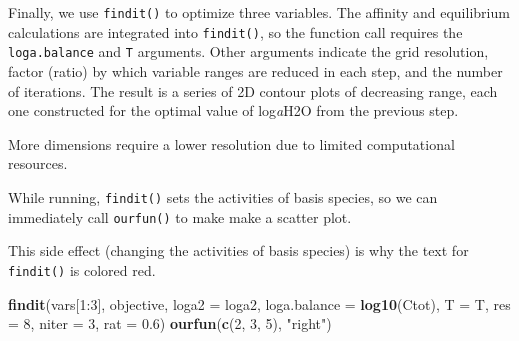 \documentclass[]{tufte-book}
\newenvironment{Shaded}{}{}
\newcommand{\KeywordTok}[1]{\textcolor[rgb]{0.00,0.44,0.13}{\textbf{#1}}}
\newcommand{\DataTypeTok}[1]{\textcolor[rgb]{0.56,0.13,0.00}{#1}}
\newcommand{\DecValTok}[1]{\textcolor[rgb]{0.25,0.63,0.44}{#1}}
\newcommand{\FloatTok}[1]{\textcolor[rgb]{0.25,0.63,0.44}{#1}}
\newcommand{\StringTok}[1]{\textcolor[rgb]{0.25,0.44,0.63}{#1}}
\newcommand{\OperatorTok}[1]{\textcolor[rgb]{0.40,0.40,0.40}{#1}}
\newcommand{\NormalTok}[1]{#1}
\begin{document}
\begin{Shaded}
\end{Shaded}

Finally, we use {\texttt{findit()}} to optimize three variables. The
affinity and equilibrium calculations are integrated into
{\texttt{findit()}}, so the function call requires the
\texttt{loga.balance} and \texttt{T} arguments. Other arguments indicate
the grid resolution, factor (ratio) by which variable ranges are reduced
in each step, and the number of iterations. The result is a series of 2D
contour plots of decreasing range, each one constructed for the optimal
value of log\emph{a}H2O from the previous step.

\begin{marginfigure}
More dimensions require a lower resolution due to limited computational
resources.
\end{marginfigure}

While running, {\texttt{findit()}} sets the activities of basis species,
so we can immediately call \texttt{ourfun()} to make make a scatter
plot.

\begin{marginfigure}
This side effect (changing the activities of basis species) is why the
text for {\texttt{findit()}} is colored red.
\end{marginfigure}

\begin{Shaded}
\begin{Highlighting}[]
\KeywordTok{findit}\NormalTok{(vars[}\DecValTok{1}\OperatorTok{:}\DecValTok{3}\NormalTok{], objective, }\DataTypeTok{loga2 =}\NormalTok{ loga2, }\DataTypeTok{loga.balance =} \KeywordTok{log10}\NormalTok{(Ctot),}
       \DataTypeTok{T =}\NormalTok{ T, }\DataTypeTok{res =} \DecValTok{8}\NormalTok{, }\DataTypeTok{niter =} \DecValTok{3}\NormalTok{, }\DataTypeTok{rat =} \FloatTok{0.6}\NormalTok{)}
\KeywordTok{ourfun}\NormalTok{(}\KeywordTok{c}\NormalTok{(}\DecValTok{2}\NormalTok{, }\DecValTok{3}\NormalTok{, }\DecValTok{5}\NormalTok{), }\StringTok{"right"}\NormalTok{)}
\end{Highlighting}
\end{Shaded}
\end{document}
